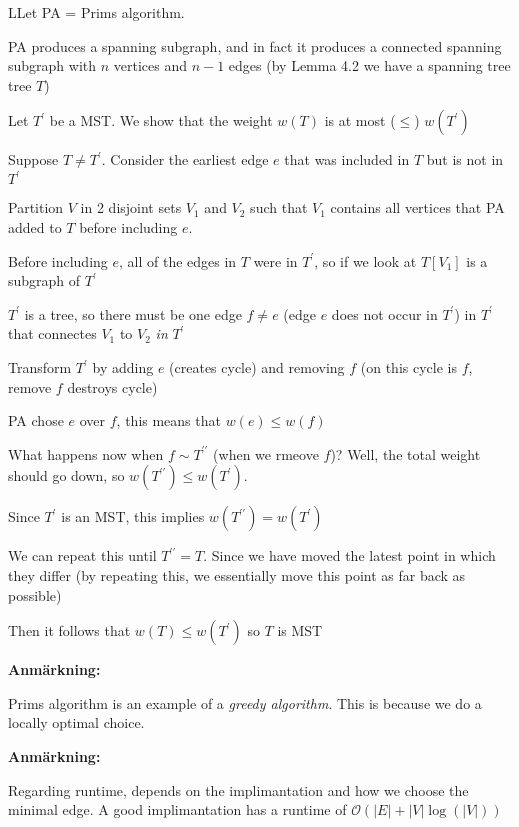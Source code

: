 \begin{prf}
  LLet PA = Prims algorithm.\par
  \noindent PA produces a spanning subgraph, and in fact it produces a connected spanning subgraph with $n$ vertices and $n-1$ edges (by Lemma 4.2 we have a spanning tree tree $T$)
  \par\bigskip
  \noindent Let $T^{\prime}$ be a MST. We show that the weight $w(T)$ is at most ($\leq$) $w(T^{\prime})$
  \par\bigskip
  \noindent Suppose $T\neq T^{\prime}$. Consider the earliest edge $e$ that was included in $T$ but is not in $T^{\prime}$
  \par\bigskip
  \noindent Partition $V$ in 2 disjoint sets $V_1$ and $V_2$ such that $V_1$ contains all vertices that PA added to $T$ before including $e$.
  \par\bigskip
  \noindent Before including $e$, all of the edges in $T$ were in $T^{\prime}$, so if we look at $T[V_1]$ is a subgraph of $T^{\prime}$
  \par\bigskip
  \noindent $T^{\prime}$ is a tree, so there must be one edge $f\neq e$ (edge $e$ does not occur in $T^{\prime}$) in $T^{\prime}$ that connectes $V_1$ to $V_2$ \textit{in} $T^{\prime}$
  \par\bigskip
  \noindent Transform $T^{\prime}$ by adding $e$ (creates cycle) and removing $f$ (on this cycle is $f$, remove $f$ destroys cycle)
  \par\bigskip
  \noindent PA chose $e$ over $f$, this means that $w(e)\leq w(f)$
  \par\bigskip
  \noindent What happens now when $f\sim T^{\prime\prime}$ (when we rmeove $f$)? Well, the total weight should go down, so $w(T^{\prime\prime})\leq w(T^{\prime})$.
  \par\bigskip
  \noindent Since $T^{\prime}$ is an MST, this implies $w(T^{\prime\prime}) = w(T^{\prime})$
  \par\bigskip
  \noindent We can repeat this until $T^{\prime\prime} = T$. Since we have moved the latest point in which they differ (by repeating this, we essentially move this point as far back as possible)
  \par\bigskip
  \noindent Then it follows that $w(T)\leq w(T^{\prime})$ so $T$ is MST
\end{prf}
\par\bigskip
\noindent\textbf{Anmärkning:}\par
\noindent Prims algorithm is an example of a \textit{greedy algorithm}. This is because we do a locally optimal choice.
\par\bigskip
\noindent\textbf{Anmärkning:}\par
\noindent Regarding runtime, depends on the implimantation and how we choose the minimal edge. A good implimantation has a runtime of $\mathcal{O}(\left|E\right|+\left|V\right|\log(\left|V\right|))$
\par\bigskip
